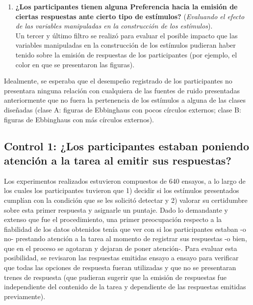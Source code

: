 \begin{enumerate}
\item \textbf{¿Los participantes tienen alguna Preferencia hacia la emisión de ciertas respuestas ante cierto tipo de estímulos?} (\textit{Evaluando el efecto de las variables manipuladas en la construcción de los estímulos}).\\

Un tercer y último filtro se realizó para evaluar el posible impacto que las variables manipuladas en la construcción de los estímulos pudieran haber tenido sobre la emisión de respuestas de los participantes (por ejemplo, el color en que se presentaron las figuras).\\

\end{enumerate}

Idealmente, se esperaba que el desempeño registrado de los participantes no presentara ninguna relación con cualquiera de las fuentes de ruido presentadas anteriormente que no fuera la pertenencia de los estímulos a alguna de las clases diseñadas (clase A: figuras de Ebbinghaus con pocos círculos externos; clase B: figuras de Ebbinghaus con más círculos externos).\\






\subsection{Control 1: ¿Los participantes estaban poniendo atención a la tarea al emitir sus respuestas?}

Los experimentos realizados estuvieron compuestos de 640 ensayos, a lo largo de los cuales los participantes tuvieron que 1) decidir si los estímulos presentados cumplían con la condición que se les solicitó detectar y 2) valorar su certidumbre sobre esta primer respuesta y asignarle un puntaje. Dado lo demandante y extenso que fue el procedimiento, una primer preocupación respecto a la fiabilidad de los datos obtenidos tenía que ver con si los participantes estaban -o no- prestando atención a la tarea al momento de registrar sus respuestas -o bien, que en el proceso se agotaran y dejaran de poner atención-. Para evaluar esta posibilidad, se revisaron las respuestas emitidas ensayo a ensayo para verificar que todas las opciones de respuesta fueran utilizadas y que no se presentaran trenes de respuesta (que pudieran sugerir que la emisión de respuestas fue independiente del contenido de la tarea y dependiente de las respuestas emitidas previamente).\\

